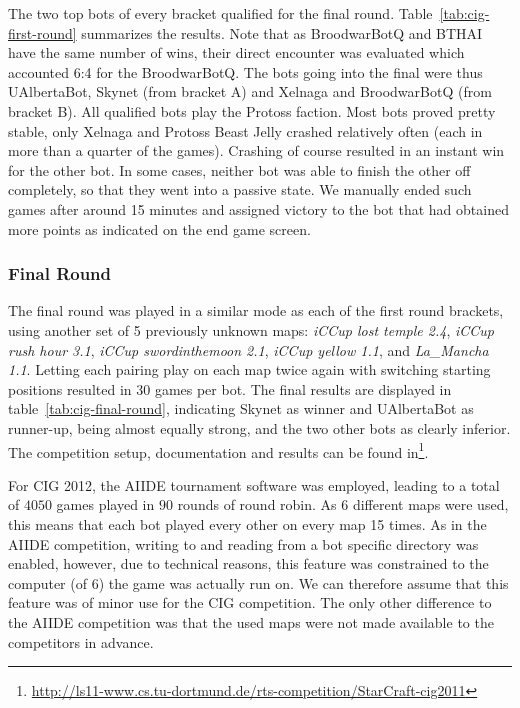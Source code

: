 \documentclass[journal]{IEEEtran}
\begin{document}
The two top bots of every bracket qualified
for the final round. Table~\ref{tab:cig-first-round} summarizes
the results.
Note that as BroodwarBotQ and BTHAI have the same number of wins,
their direct encounter was evaluated which accounted 6:4 for the BroodwarBotQ.
The bots going into the final were thus UAlbertaBot, Skynet (from bracket A)
and Xelnaga and BroodwarBotQ (from bracket B). All qualified bots play the
Protoss faction. Most bots proved pretty stable, only Xelnaga and Protoss 
Beast Jelly crashed relatively often (each in more than a quarter of the games). 
Crashing of course resulted in an instant win for the other bot.
In some cases, neither bot was able to finish the other off completely,
so that they went into a passive state. We manually ended such games after
around 15 minutes and assigned victory to the bot that had obtained more
points as indicated on the end game screen.

\subsubsection{Final Round}
\label{sec:cig-final-round}

The final round was played in a similar mode as each of the
first round brackets,
using another set of 5 previously unknown maps:
\emph{iCCup lost temple 2.4}, \emph{iCCup rush hour 3.1},
\emph{iCCup swordinthemoon 2.1}, \emph{iCCup yellow 1.1},
and \emph{La\_Mancha 1.1}. 
Letting each pairing play on each map twice again with
switching starting positions resulted in 30 games per bot.
The final results are displayed in table~\ref{tab:cig-final-round},
indicating Skynet as winner and UAlbertaBot as runner-up, being
almost equally strong, and the two other bots as clearly inferior.
The competition setup, documentation and results can be found
in\footnote{\url{http://ls11-www.cs.tu-dortmund.de/rts-competition/StarCraft-cig2011}}.


For CIG 2012, the AIIDE tournament software was employed,
leading to a total of $4050$ games played in $90$ rounds
of round robin. As 6 different maps were used, this means
that each bot played every other on every map 15 times. 
As in the AIIDE competition, writing to and reading from
a bot specific directory was enabled, however, due to 
technical reasons, this feature was constrained to the
computer (of 6) the game was actually run on. We can 
therefore assume that this feature was of minor use for
the CIG competition. The only other difference to the
AIIDE competition was that the used maps were not 
made available to the competitors in advance. 
\end{document}
